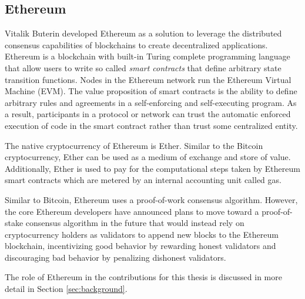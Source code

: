 \subsection{Ethereum}

Vitalik Buterin developed Ethereum as a solution to leverage the distributed
consensus capabilities of blockchains to create decentralized
applications. Ethereum is a blockchain with built-in Turing
complete programming language that allow users to write so called \textit{smart
  contracts} that define arbitrary state transition functions\cite{ethereum}.
Nodes in the Ethereum network run the Ethereum Virtual Machine (EVM). The value
proposition of smart contracts is the ability to define arbitrary rules and
agreements in a self-enforcing and self-executing program. As a result,
participants in a protocol or network can trust the automatic enforced execution
of code in the smart contract rather than trust some centralized entity.

The native cryptocurrency of Ethereum is Ether. Similar to the Bitcoin
cryptocurrency, Ether can be used as a medium of exchange and store of value.
Additionally, Ether is used to pay for the computational steps taken by Ethereum
smart contracts which are metered by an internal accounting unit called gas.

Similar to Bitcoin, Ethereum uses a proof-of-work consensus algorithm. However,
the core Ethereum developers have announced plans to move toward a
proof-of-stake consensus algorithm in the future that would instead rely on
cryptocurrency holders as validators to append new blocks to the Ethereum blockchain,
incentivizing good behavior by rewarding honest validators and discouraging bad
behavior by penalizing dishonest validators\cite{casper}.

The role of Ethereum in the contributions for this thesis is discussed in more
detail in Section \ref{sec:background}.

